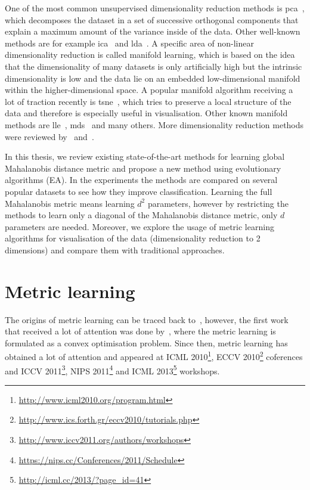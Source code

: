 \documentclass[12pt,a4paper]{report}
\begin{document}
One of the most common unsupervised dimensionality reduction methods is \ac{pca}~\citep{jolliffe1986principal}, which decomposes the dataset in a set of successive orthogonal components that explain a maximum amount of the variance inside of the data. Other well-known methods are for example \ac{ica}~\citep{comon1994independent} and \ac{lda}~\citep{fisher1936use}. A specific area of non-linear dimensionality reduction is called manifold learning, which is based on the idea that the dimensionality of many datasets is only artificially high but the intrinsic dimensionality is low and the data lie on an embedded low-dimensional manifold within the higher-dimensional space. A popular manifold algorithm receiving a lot of traction recently is \ac{tsne}~\citep{maaten2008visualizing}, which tries to preserve a local structure of the data and therefore is especially useful in visualisation. Other known manifold methods are \ac{lle}~\citep{roweis2000nonlinear}, \ac{mds}~\citep{kruskal1978multidimensional} and many others. More dimensionality reduction methods were reviewed by~\citep{fodor2002survey} and~\citep{van2009dimensionality}.

In this thesis, we review existing state-of-the-art methods for learning global Mahalanobis distance metric and propose a new method using evolutionary algorithms (EA). In the experiments the methods are compared on several popular datasets to see how they improve classification. Learning the full Mahalanobis metric means learning $d^2$ parameters, however by restricting the methods to learn only a diagonal of the Mahalanobis distance metric, only $d$ parameters are needed. Moreover, we explore the usage of metric learning algorithms for visualisation of the data (dimensionality reduction to 2 dimensions) and compare them with traditional approaches.

\section{Metric learning} \label{chap:intro:ml}

The origins of metric learning can be traced back to~\citep{short1981optimal}, however, the first work that received a lot of attention was done by~\citep{xing2002distance}, where the metric learning is formulated as a convex optimisation problem. Since then, metric learning has obtained a lot of attention and appeared at ICML 2010\footnote{\url{http://www.icml2010.org/program.html}}, ECCV 2010\footnote{\url{http://www.ics.forth.gr/eccv2010/tutorials.php}} coferences and ICCV 2011\footnote{\url{http://www.iccv2011.org/authors/workshops}}, NIPS 2011\footnote{\url{https://nips.cc/Conferences/2011/Schedule}} and ICML 2013\footnote{\url{http://icml.cc/2013/?page_id=41}} workshops.
\end{document}
